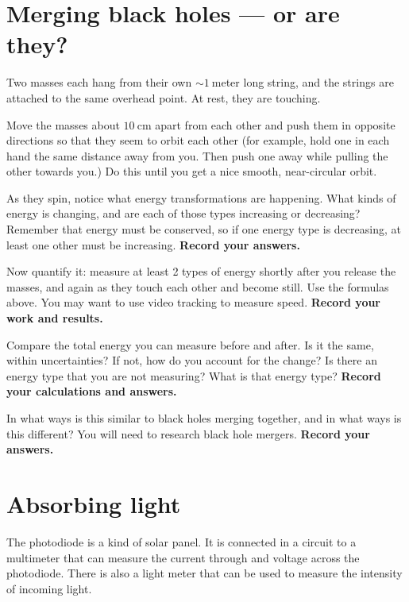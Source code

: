 \section{Merging black holes --- or are they?}

Two masses each hang from their own $\sim 1\:$meter long string, and the strings are attached to the same overhead point. At rest, they are touching.

\begin{steps}
	\item Move the masses about $10\:$cm apart from each other and push them in opposite directions so that they seem to orbit each other (for example, hold one in each hand the same distance away from you. Then push one away while pulling the other towards you.) Do this until you get a nice smooth, near-circular orbit.
	
	\item As they spin, notice what energy transformations are happening. What kinds of energy is changing, and are each of those types increasing or decreasing? Remember that energy must be conserved, so if one energy type is decreasing, at least one other must be increasing. \textbf{Record your answers.}
	
	\item Now quantify it: measure at least 2 types of energy shortly after you release the masses, and again as they touch each other and become still. Use the formulas above. You may want to use video tracking to measure speed. \textbf{Record your work and results.}
	
	\item Compare the total energy you can measure before and after. Is it the same, within uncertainties? If not, how do you account for the change? Is there an energy type that you are not measuring? What is that energy type? \textbf{Record your calculations and answers.}
	
	\item In what ways is this similar to black holes merging together, and in what ways is this different? You will need to research black hole mergers. \textbf{Record your answers.}
\end{steps}

\section{Absorbing light}

The photodiode is a kind of solar panel. It is connected in a circuit to a multimeter that can measure the current through and voltage across the photodiode. There is also a light meter that can be used to measure the intensity of incoming light.


